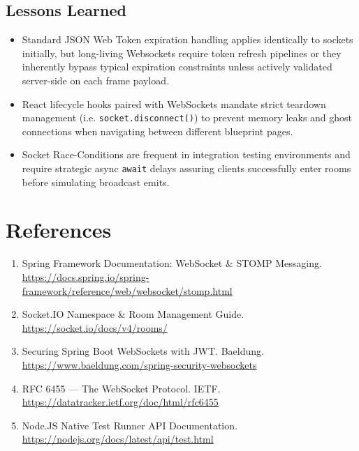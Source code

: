 \documentclass[10pt,a4paper,twocolumn]{article}
\begin{document}
\subsection{Lessons Learned}

\begin{itemize}
  \item Standard JSON Web Token expiration handling applies identically to sockets initially, but long-living Websockets require token refresh pipelines or they inherently 
        bypass typical expiration constraints unless actively validated server-side on 
        each frame payload.
  \item React lifecycle hooks paired with WebSockets mandate strict teardown management (i.e. \texttt{socket.disconnect()}) to prevent memory leaks and ghost connections when navigating between different blueprint pages.
  \item Socket Race-Conditions are frequent in integration testing environments 
        and require strategic async \texttt{await} delays assuring clients 
        successfully enter rooms before simulating broadcast emits.
\end{itemize}

\section{References}

\begin{enumerate}
  \item Spring Framework Documentation: WebSocket \& STOMP Messaging. 
        \url{https://docs.spring.io/spring-framework/reference/web/websocket/stomp.html}

  \item Socket.IO Namespace \& Room Management Guide.
        \url{https://socket.io/docs/v4/rooms/}

  \item Securing Spring Boot WebSockets with JWT. Baeldung.
        \url{https://www.baeldung.com/spring-security-websockets}

  \item RFC 6455 --- The WebSocket Protocol. IETF.
        \url{https://datatracker.ietf.org/doc/html/rfc6455}

  \item Node.JS Native Test Runner API Documentation.
        \url{https://nodejs.org/docs/latest/api/test.html}
\end{enumerate}
\end{document}
